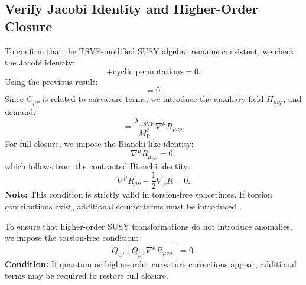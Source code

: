 \documentclass[12pt, onecolumn]{article}
\theoremstyle{definition}
\newcommand{\tsvf}{\lambda_{\mathrm{TSVF}}}
\newcommand{\Mp}{M_{\mathrm{P}}}
\numberwithin{equation}{section}
\begin{document}
\subsection{Verify Jacobi Identity and Higher-Order Closure}
To confirm that the TSVF-modified SUSY algebra remains consistent, we check the Jacobi identity:
\begin{equation}
[Q_\alpha, {Q_\beta, A_\mu}] + \text{cyclic permutations} = 0.
\end{equation}
Using the previous result:
\begin{equation}
[Q_\alpha, 2 \sigma^\rho_{\beta\gamma} F_{\rho\mu} + \frac{\tsvf}{\Mp^2} G_{\mu\nu}] = 0.
\end{equation}
Since $G_{\mu\nu}$ is related to curvature terms, we introduce the auxiliary field $H_{\mu\nu\rho}$, and demand:
\begin{equation}
[Q_\alpha, \nabla^\mu H_{\mu\nu\rho}] = \frac{\tsvf}{\Mp^2} \nabla^\mu R_{\mu\nu\rho}.
\end{equation}
For full closure, we impose the Bianchi-like identity:
\begin{equation}
\nabla^\mu R_{\mu\nu\rho} = 0,
\end{equation}
which follows from the contracted Bianchi identity:
\begin{equation}
\nabla^\mu R_{\mu\nu} - \frac{1}{2} \nabla_\nu R = 0.
\end{equation}
\textbf{Note:} This condition is strictly valid in torsion-free spacetimes. If torsion contributions exist, additional counterterms must be introduced.

To ensure that higher-order SUSY transformations do not introduce anomalies, we impose the torsion-free condition:
\begin{equation}
{ Q_\alpha, [Q_\beta, \nabla^\mu R_{\mu\nu\rho}] } = 0.
\end{equation}
\textbf{Condition:} If quantum or higher-order curvature corrections appear, additional terms may be required to restore full closure.
\end{document}
